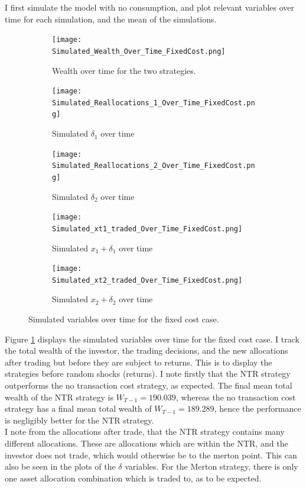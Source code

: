 \documentclass[11pt]{article}
\begin{document}
I first simulate the model with no consumption, and plot relevant variables over time for each simulation, and the mean of the simulations.
\begin{figure}[!ht]
    \centering
    \begin{subfigure}[t]{0.8\textwidth} %
        \centering
        \texttt{[image: Simulated\_Wealth\_Over\_Time\_FixedCost.png]}
        \caption{Wealth over time for the two strategies.}
    \end{subfigure}

    \vspace{1em} %
    \begin{subfigure}[t]{0.49\textwidth}
        \centering
        \texttt{[image: Simulated\_Reallocations\_1\_Over\_Time\_FixedCost.png]}
        \caption{Simulated $\delta_{1}$ over time}
    \end{subfigure}%
    \hfill
    \begin{subfigure}[t]{0.49\textwidth}
        \centering
        \texttt{[image: Simulated\_Reallocations\_2\_Over\_Time\_FixedCost.png]}
        \caption{Simulated $\delta_{2}$ over time}
    \end{subfigure}

    \vspace{1em} %
    \begin{subfigure}[t]{0.49\textwidth}
        \centering
        \texttt{[image: Simulated\_xt1\_traded\_Over\_Time\_FixedCost.png]}
        \caption{Simulated $x_{1} + \delta_{1}$ over time}
    \end{subfigure}%
    \hfill
    \begin{subfigure}[t]{0.49\textwidth}
        \centering
        \texttt{[image: Simulated\_xt2\_traded\_Over\_Time\_FixedCost.png]}
        \caption{Simulated $x_{2} + \delta_{2}$ over time}
    \end{subfigure}
    \caption{Simulated variables over time for the fixed cost case.}
    \label{fig: Simulated_Over_Time_FixedCost}
\end{figure}
Figure \ref{fig: Simulated_Over_Time_FixedCost} displays the simulated variables over time for the fixed cost case.
I track the total wealth of the investor, the trading decisions, and the new allocations after trading but before they are subject to returns.
This is to display the strategies before random shocks (returns).
I note firstly that the NTR strategy outperforms the no transaction cost strategy, as expected.
The final mean total wealth of the NTR strategy is $W_{T-1} = 190.039$, whereas the no transaction cost strategy has a final mean total wealth of $W_{T-1} = 189.289$,
hence the performance is negligibly better for the NTR strategy.\\
I note from the allocations after trade, that the NTR strategy contains many different allocations. These are allocations which are within the NTR, and the investor does not trade,
which would otherwise be to the merton point. This can also be seen in the plots of the $\delta$ variables.
For the Merton strategy, there is only one asset allocation combination which is traded to, as to be expected.
\end{document}
